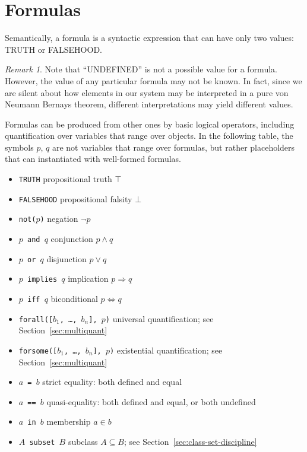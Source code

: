 \documentclass{amsbook}[openany]
\theoremstyle{definition}
\theoremstyle{remark}
\newtheorem{remark}{Remark}[chapter]
\theoremstyle{remark}
\begin{document}
\section{Formulas}

Semantically, a formula is a syntactic expression that can have only
two values: TRUTH or FALSEHOOD. 
%
\begin{remark}\label{remark:27137-52766-301830}
%
Note that ``UNDEFINED'' is not a possible value for a
formula. However, the value of any particular formula may not be
known. In fact, since we are silent about how elements in our system
may be interpreted in a pure von Neumann Bernays theorem, different
interpretations may yield different values.
%
\end{remark}

Formulas can be produced from other ones by basic logical operators,
including quantification over variables that range over objects.
%
In the following table, the symbols $p$, $q$ are not variables that
range over formulas, but rather placeholders that can instantiated
with well-formed formulas.

\begin{itemize}[label=\textendash, leftmargin=1cm]
\item \texttt{TRUTH} propositional truth $\top$
\item \texttt{FALSEHOOD} propositional falsity $\bot$
\item \texttt{not($p$)} negation $\lnot p$
\item \texttt{$p$ and $q$} conjunction $p \land q$
\item \texttt{$p$ or $q$} disjunction $p \lor q$
\item \texttt{$p$ implies $q$} implication $p \Rightarrow q$
\item \texttt{$p$ iff $q$} biconditional $p \Leftrightarrow q$
\item \texttt{forall([$b_1$, \ldots, $b_n$], $p$)} universal quantification; see Section~\ref{sec:multiquant}
\item \texttt{forsome([$b_1$, \ldots, $b_n$], $p$)} existential quantification; see Section~\ref{sec:multiquant}
\item \texttt{$a$ = $b$} strict equality: both defined and equal
\item \texttt{$a$ == $b$} quasi-equality: both defined and equal, or both undefined
\item \texttt{$a$ in $b$} membership $a \in b$
\item \texttt{$A$ subset $B$} subclass $A \subseteq B$; see Section~\ref{sec:class-set-discipline}
\end{itemize}
\end{document}
